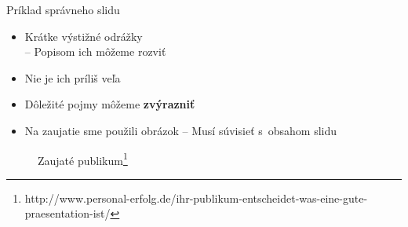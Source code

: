 \documentclass[mode=present,paper=a4paper,orient=landscape, style=sailor]{powerdot}
\begin{document}
\begin{slide}{Príklad správneho slidu}
\begin{itemize}
\item Krátke výstižné odrážky\\
	-- Popisom ich môžeme rozviť\\
\item Nie je ich príliš veľa\\
\item Dôležité pojmy môžeme \textbf{zvýrazniť}\\
\item Na zaujatie sme použili obrázok
	-- Musí súvisieť s~obsahom slidu
\end{itemize}
\vspace{-1em}
\begin{figure}[h]
\caption[Obrázok]{Zaujaté publikum\footnote{\tiny http://www.personal-erfolg.de/ihr-publikum-entscheidet-was-eine-gute-praesentation-ist/}}
\end{figure}
\end{slide}
\end{document}
